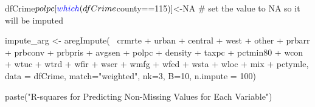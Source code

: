 \documentclass[]{article}
\newenvironment{Shaded}{}{}
\newcommand{\CommentTok}[1]{\textcolor[rgb]{0.00,0.50,0.00}{#1}}
\newcommand{\DataTypeTok}[1]{#1}
\newcommand{\DecValTok}[1]{#1}
\newcommand{\KeywordTok}[1]{\textcolor[rgb]{0.00,0.00,1.00}{#1}}
\newcommand{\NormalTok}[1]{#1}
\newcommand{\OperatorTok}[1]{#1}
\newcommand{\OtherTok}[1]{\textcolor[rgb]{1.00,0.25,0.00}{#1}}
\newcommand{\StringTok}[1]{\textcolor[rgb]{0.00,0.50,0.50}{#1}}
\begin{document}
\begin{Shaded}
\begin{Highlighting}[]
\NormalTok{dfCrime}\OperatorTok{$}\NormalTok{polpc[}\KeywordTok{which}\NormalTok{(dfCrime}\OperatorTok{$}\NormalTok{county}\OperatorTok{==}\DecValTok{115}\NormalTok{)]<-}\OtherTok{NA} \CommentTok{# set the value to NA so it will be imputed}
\end{Highlighting}
\end{Shaded}

\begin{Shaded}
\begin{Highlighting}[]
\NormalTok{impute_arg <-}\StringTok{ }\KeywordTok{aregImpute}\NormalTok{(}\OperatorTok{~}\StringTok{ }\NormalTok{crmrte }\OperatorTok{+}\StringTok{  }\NormalTok{urban }\OperatorTok{+}\StringTok{ }\NormalTok{central }\OperatorTok{+}\StringTok{ }\NormalTok{west }\OperatorTok{+}\StringTok{ }\NormalTok{other }\OperatorTok{+}
\StringTok{                         }\NormalTok{prbarr }\OperatorTok{+}\StringTok{ }\NormalTok{prbconv }\OperatorTok{+}\StringTok{ }\NormalTok{prbpris }\OperatorTok{+}\StringTok{ }\NormalTok{avgsen }\OperatorTok{+}\StringTok{ }\NormalTok{polpc }\OperatorTok{+}
\StringTok{                         }\NormalTok{density }\OperatorTok{+}\StringTok{ }\NormalTok{taxpc }\OperatorTok{+}\StringTok{ }\NormalTok{pctmin80 }\OperatorTok{+}\StringTok{ }\NormalTok{wcon }\OperatorTok{+}\StringTok{ }\NormalTok{wtuc }\OperatorTok{+}
\StringTok{                         }\NormalTok{wtrd }\OperatorTok{+}\StringTok{ }\NormalTok{wfir }\OperatorTok{+}\StringTok{ }\NormalTok{wser }\OperatorTok{+}\StringTok{ }\NormalTok{wmfg }\OperatorTok{+}\StringTok{ }\NormalTok{wfed }\OperatorTok{+}\StringTok{ }\NormalTok{wsta }\OperatorTok{+}\StringTok{ }\NormalTok{wloc }\OperatorTok{+}
\StringTok{                         }\NormalTok{mix }\OperatorTok{+}\StringTok{ }\NormalTok{pctymle, }\DataTypeTok{data =}\NormalTok{ dfCrime, }\DataTypeTok{match=}\StringTok{"weighted"}\NormalTok{,}
                         \DataTypeTok{nk=}\DecValTok{3}\NormalTok{, }\DataTypeTok{B=}\DecValTok{10}\NormalTok{, }\DataTypeTok{n.impute =} \DecValTok{100}\NormalTok{)}
\end{Highlighting}
\end{Shaded}

\begin{Shaded}
\begin{Highlighting}[]
\KeywordTok{paste}\NormalTok{(}\StringTok{"R-squares for Predicting Non-Missing Values for Each Variable"}\NormalTok{)}
\end{Highlighting}
\end{Shaded}
\end{document}
